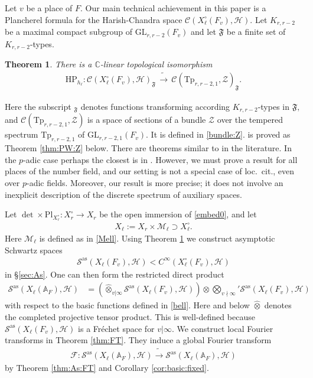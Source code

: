 \documentclass[12pt]{amsart}
\newtheorem{thm}{Theorem}[section]
\theoremstyle{remark}
\numberwithin{equation}{section}
\newcommand{\A}{\mathbb{A}}
\newcommand{\GL}{\mathrm{GL}}
\newcommand{\lto}{\longrightarrow}
\newcommand{\CC}{\mathbb{C}}
\theoremstyle{definition}
\numberwithin{equation}{subsection}
\begin{document}
Let $v$ be a place of $F.$ Our main technical achievement in this paper is a Plancherel formula for the Harish-Chandra space $\mathcal{C}(X_\ell^\circ(F_v),\mathcal{H}).$  Let $K_{r,r-2}$ be a maximal compact subgroup of $\GL_{r,r-2}(F_v)$ and let $\mathfrak{F}$ be a finite set of $K_{r,r-2}$-types.
\begin{thm} \label{Planch:intro}
There is a $\CC$-linear topological isomorphism
\begin{align*}
\mathrm{HP}_{h_\ell}:    \mathcal{C}(X^\circ_{\ell}(F_v),\mathcal{H})_{\mathfrak{F}} \,\tilde{\lto}\, \mathcal{C}(\mathrm{Tp}_{r,r-2,1},\mathcal{Z})_{\mathfrak{F}}.
\end{align*}
\end{thm}
Here the subscript $_{\mathfrak{F}}$ denotes functions transforming according $K_{r,r-2}$-types in $\mathfrak{F},$ and
$\mathcal{C}(\mathrm{Tp}_{r,r-2,1},\mathcal{Z})$ is a space of sections of a bundle $\mathcal{Z}$ over the tempered spectrum $\mathrm{Tp}_{r,r-2,1}$ of $\GL_{r,r-2,1}(F_v).$  It is defined in \eqref{bundle:Z}.  
 is proved as 
 Theorem \ref{thm:PW:Z} below.  There are theorems similar to  in the literature. In the $p$-adic case perhaps the closest is in \cite{Delorme:Harinck:Sakellaridis}.  However, we must prove a result for all places of the number field, and our setting is not a special case of loc.~cit., even over $p$-adic fields.  Moreover, our result is more precise; it does not involve an inexplicit description of the discrete spectrum of auxiliary spaces.

Let $\det \times \mathrm{Pl}_{X_r^\circ}: X_{r}^\circ \lto X_{r}$ be the open immersion of \eqref{embed0}, and let 
\begin{align*}
X_\ell:=X_{r} \times \mathcal{M}_\ell \supset X_\ell^\circ.
\end{align*}
Here $\mathcal{M}_\ell$ is defined as in \eqref{Mell}. Using Theorem \ref{Planch:intro} we construct asymptotic Schwartz spaces 
\begin{align*}
\mathcal{S}^{\mathrm{as}}(X_\ell(F_v),\mathcal{H}) <C^\infty(X^\circ_\ell(F_v),\mathcal{H})
\end{align*}
in \S \ref{sec:As}. One can then form the restricted direct product
\begin{align*}
    \mathcal{S}^{\mathrm{as}}(X_\ell(\A_F) ,\mathcal{H}) &=  \left(\widehat{\otimes}_{v|\infty}\mathcal{S}^{\mathrm{as}}(X_\ell(F_v) ,\mathcal{H})\right) \otimes \bigotimes_{v\nmid\infty}{}'\mathcal{S}^{\mathrm{as}}(X_{\ell}(F_v),\mathcal{H}) 
\end{align*}
with respect to the basic functions defined in \eqref{bell}.  Here and below $\widehat{\otimes}$ denotes the completed projective tensor product.   This is well-defined because
$\mathcal{S}^{\mathrm{as}}(X_\ell(F_v) ,\mathcal{H})$ is a Fr\'echet space for $v|\infty.$   We construct local Fourier transforms in Theorem \ref{thm:FT}. They induce a global Fourier transform
\begin{align*}
\mathcal{F}:    \mathcal{S}^{\mathrm{as}}(X_{\ell}(\A_F),\mathcal{H}) \tilde{\lto}  \mathcal{S}^{\mathrm{as}}(X_{\ell}(\A_F),\mathcal{H})
\end{align*}
by Theorem \ref{thm:As:FT} and Corollary \ref{cor:basic:fixed}.
\end{document}
